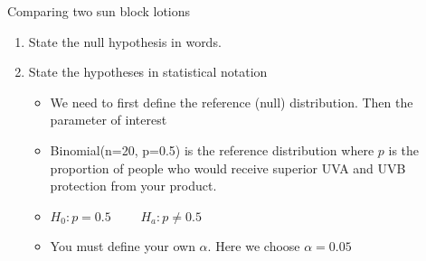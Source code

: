 \documentclass{beamer}\usepackage[]{graphicx}\usepackage[]{color}
\begin{document}
\begin{frame}[fragile]{Comparing two sun block lotions}
\small
\begin{enumerate}
	\setlength\itemsep{1em}
	\item State the null hypothesis in words. \pause
	\item State the hypotheses in statistical notation \pause
	\begin{itemize}
			\setlength\itemsep{.71em}
		\item We need to first define the reference (null) distribution. Then the parameter of interest \pause
		\item Binomial(n=20, p=0.5) is the reference distribution where $p$ is the proportion of people who would receive superior UVA and UVB protection from your product. \pause 
		\item[] $H_0: p = 0.5 \qquad$ $H_a: p \neq 0.5$ \pause
		\item You must define your own $\alpha$. Here we choose $\alpha=0.05$ 		
	\end{itemize}
      
 
\end{enumerate}

\end{frame}
\end{document}
